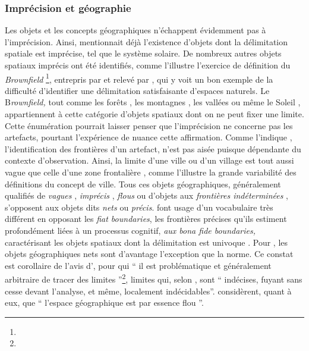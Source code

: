 \subsubsection{Imprécision et géographie}

Les objets et les concepts géographiques n’échappent évidemment pas à
l’imprécision. Ainsi, \textcite{Russell1923} mentionnait déjà
l’existence d’objets dont la délimitation spatiale est imprécise, tel
que le système solaire. De nombreux autres objets spatiaux imprécis
ont été identifiés, comme l’illustre l’exercice de définition du
\emph{Brownfield} \footnote{}, entrepris par \textcite{Alker2000} et
relevé par \textcite{Bennett2001}, qui y voit un bon exemple de la
difficulté d’identifier une délimitation satisfaisante d’espaces
naturels. Le B\emph{rownfield,} tout comme les forêts
\autocite{Bennett2001,Dilo2006,Fisher2006}, les montagnes
\autocite{Varzi2001,Varzi2015,Fisher2006,Chaudhry2008}, les vallées
\autocite{Schneider2003} ou même le Soleil \autocite{Simons1999},
appartiennent à cette catégorie d’objets spatiaux dont on ne peut
fixer une limite. Cette énumération pourrait laisser penser que
l’imprécision ne concerne pas les artefacts, pourtant l’expérience de
\textcite{Perec1974} nuance cette affirmation. Comme l’indique
\textcite{Campari1996}, l’identification des frontières d’un artefact,
n’est pas aisée puisque dépendante du contexte d’observation. Ainsi,
la limite d’une ville ou d’un village est tout aussi vague que celle
d’une zone frontalière \autocite{Varzi2001, Fisher2006}, comme
l’illustre la grande variabilité des définitions du concept de ville.
Tous ces objets géographiques, généralement qualifiés de \emph{vagues}
\autocite{Erwig1997}, \emph{imprécis} \autocite{Winter2000},
\emph{flous} \autocite{Lagacherie1996} ou d’objets aux
\emph{frontières indéterminées} \autocite{Burrough1996}, s’opposent
aux objets dits \emph{nets} \autocite{Schneider2001} ou
\emph{précis}. \textcite{Smith1995, Smith1997, Smith2000} font usage
d’un vocabulaire très différent en opposant les \emph{fiat
  boundaries}, \ie les frontières précises qu’ils estiment
profondément liées à un processus cognitif, \emph{aux bona fide
  boundaries, }caractérisant les objets spatiaux dont la délimitation
est univoque \autocite{Varzi2015}. Pour \textcite{Couclelis1996}, les
objets géographiques nets sont d’avantage l’exception que la norme. Ce
constat est corollaire de l’avis
d’\textcite[p. 200]{OddAmbrosetti1987}, pour qui \enquote{\textelp{}
  il est problématique et généralement arbitraire de tracer des
  limites \textelp{}}\footnote{}, limites qui, selon
\textcite[P. 106]{Brunet2001}, sont \enquote{\textelp{} indécises,
  fuyant sans cesse devant l’analyse, et même, localement
  indécidables}. \textcite{Dutozia2014} considèrent, quant à eux, que
\enquote{\textelp{} l’espace géographique est par essence flou
  \textelp{}}.

